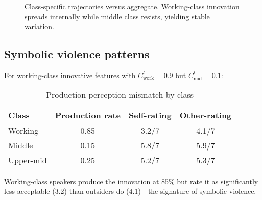 \documentclass[12pt]{article}
\begin{document}
\begin{figure}[h]
\centering
{}
\caption{Class-specific trajectories versus aggregate. Working-class innovation spreads internally while middle class resists, yielding stable variation.}
\label{fig:class-curves}
\end{figure}

\subsection{Symbolic violence patterns}

For working-class innovative features with $C^t_{\text{work}} = 0.9$ but $C^t_{\text{mid}} = 0.1$:

\begin{table}[h]
\centering
\caption{Production-perception mismatch by class}
\begin{tabular}{lccc}
\toprule
Class & Production rate & Self-rating & Other-rating \\
\midrule
Working    & 0.85 & 3.2/7 & 4.1/7 \\
Middle     & 0.15 & 5.8/7 & 5.9/7 \\
Upper-mid  & 0.25 & 5.2/7 & 5.3/7 \\
\bottomrule
\end{tabular}
\end{table}

Working-class speakers produce the innovation at 85\% but rate it as significantly less acceptable (3.2) than outsiders do (4.1)—the signature of symbolic violence.
\end{document}
